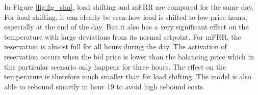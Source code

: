 In Figure \ref{fig:fig_sim}, load shifting and mFRR are compared for the same day. For load shifting, it can clearly be seen how load is shifted to low-price hours, especially at the end of the day. But it also has a very significant effect on the temperature with large deviations from its normal setpoint. For mFRR, the reservation is almost full for all hours during the day. The activation of reservation occurs when the bid price is lower than the balancing price which in this particular scenario only happens for three hours. The effect on the temperature is therefore much smaller than for load shifting. The model is also able to rebound smartly in hour 19 to avoid high rebound costs.

\begin{figure}[!t]
    \centering
    \hfil

\end{figure}
